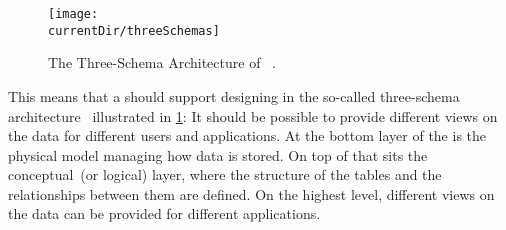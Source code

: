 \begin{figure}%
\centering%
\texttt{[image: \\currentDir/threeSchemas]}%
\caption{The Three-Schema Architecture of ~\cite{AXSSGDMS1978FRODMS,TK1978TAXSDFROTSGODMS,BFJKMRGRT1985RMFDSDAFTGDOTAXSDSSG,SS2005EIDDDFDB:I}.}%
\label{fig:threeSchemas}%
\end{figure}

This means that a  should support designing  in the so-called three-schema architecture~\cite{AXSSGDMS1978FRODMS,TK1978TAXSDFROTSGODMS,BFJKMRGRT1985RMFDSDAFTGDOTAXSDSSG,SS2005EIDDDFDB:I} illustrated in \cref{fig:threeSchemas}:
It should be possible to provide different views on the data for different users and applications.
At the bottom layer of the  is the physical model managing how data is stored.
On top of that sits the conceptual~(or logical) layer, where the structure of the tables and the relationships between them are defined.
On the highest level, different views on the data can be provided for different applications.

